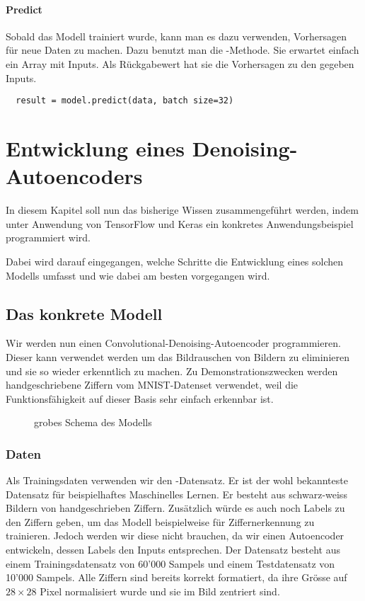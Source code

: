 \subsubsection{Predict}
Sobald das Modell trainiert wurde, kann man es dazu verwenden, Vorhersagen für
neue Daten zu machen. Dazu benutzt man die -Methode. Sie erwartet
einfach ein Array mit Inputs. Als Rückgabewert hat sie die Vorhersagen zu den
gegeben Inputs.

\begin{verbatim}
  result = model.predict(data, batch size=32)
\end{verbatim}



\chapter{Entwicklung eines Denoising-Autoencoders}
In diesem Kapitel soll nun das bisherige Wissen zusammengeführt werden, indem
unter Anwendung von TensorFlow und Keras ein konkretes
Anwendungsbeispiel programmiert wird.

Dabei wird darauf eingegangen, welche Schritte die
Entwicklung eines solchen Modells umfasst und wie dabei am besten vorgegangen
wird.

\section{Das konkrete Modell}
Wir werden nun einen Convolutional-Denoising-Autoencoder programmieren.
Dieser kann verwendet werden um das Bildrauschen von Bildern zu eliminieren und
sie so wieder erkenntlich zu machen.
Zu Demonstrationszwecken werden handgeschriebene Ziffern vom MNIST-Datenset
verwendet, weil die Funktionsfähigkeit auf dieser Basis sehr einfach erkennbar ist.

\begin{figure}
  \caption{grobes Schema des Modells}
\end{figure}

\para{}
\subsection{Daten}
Als Trainingsdaten verwenden wir den -Datensatz. Er ist der wohl
bekannteste Datensatz für beispielhaftes Maschinelles Lernen.
Er besteht aus schwarz-weiss Bildern von handgeschrieben Ziffern.
Zusätzlich würde es auch noch Labels zu den Ziffern geben, um das Modell beispielweise
für Ziffernerkennung zu trainieren. Jedoch werden
wir diese nicht brauchen, da wir einen Autoencoder entwickeln, dessen Labels den
Inputs entsprechen.
\para{}
Der Datensatz besteht aus einem Trainingsdatensatz von 60'000 Sampels und einem Testdatensatz
von 10'000 Sampels. Alle Ziffern sind bereits korrekt formatiert, da ihre Grösse
auf $28 \times 28$ Pixel normalisiert wurde und sie im Bild zentriert sind.

